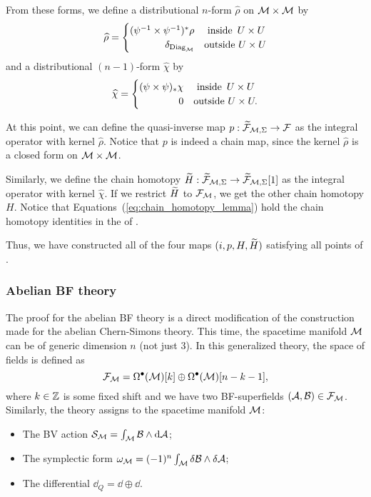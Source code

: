 From these forms, we define a distributional $n$-form $\hat{\rho}$ on $\mathcal{M} \times \mathcal{M}$ by
\begin{equation*}
    \hat{\rho} = 
        \begin{cases}
            (\psi^{-1} \times \psi^{-1})^* \rho & \text{ inside } \,  U \times U \\
             \hfill \delta_{\diag_\M}           &\text{outside } U \times U
        \end{cases}
\end{equation*}
and a distributional $(n-1)$-form $\hat{\chi}$ by
\begin{equation*}
    \hat{\chi} = 
        \begin{cases}
            (\psi \times \psi)_* \chi & \text{ inside } \,  U \times U \\
             \hfill 0                 &\text{outside } U \times U .
        \end{cases}
\end{equation*}

At this point, we can define the quasi-inverse map $p: \widetilde{\mathcal{F}}_{\mathcal{M}, \Sigma} \rightarrow \mathcal{F}$ as the integral operator with kernel $\hat{\rho}$.
Notice that $p$ is indeed a chain map, since the kernel $\hat{\rho}$ is a closed form on $\mathcal{M} \times \mathcal{M}$.

Similarly, we define the chain homotopy $\widetilde{H} : \widetilde{\mathcal{F}}_{\mathcal{M}, \Sigma} \rightarrow \widetilde{\mathcal{F}}_{\mathcal{M}, \Sigma}[1]$ as the integral operator with kernel $\hat{\chi}$.
If we restrict $\widetilde{H}$ to $\mathcal{F}_{\mathcal{M}}$, we get the other chain homotopy $H$.
Notice that Equations~(\ref{eq:chain_homotopy_lemma}) hold the chain homotopy identities in the  of .

Thus, we have constructed all of the four maps $(i, p, H, \widetilde{H})$ satisfying all points of .

\subsubsection{Abelian BF theory}
\label{subsubsec:abelain_bf_theory}

The proof for the abelian BF theory is a direct modification of the construction made for the abelian Chern-Simons theory.
This time, the spacetime manifold $\mathcal{M}$ can be of generic dimension $n$ (not just 3).
In this generalized theory, the space of fields is defined as
\begin{equation*}
    \mathcal{F}_{\mathcal{M}} = 
    \Omega^\bullet (\mathcal{M})[k] \oplus
    \Omega^\bullet (\mathcal{M})[n-k-1],
\end{equation*}
where $k \in \mathbb{Z}$ is some fixed shift and we have two BF-superfields $(\mathcal{A}, \mathcal{B}) \in \mathcal{F}_{\mathcal{M}}$.
Similarly, the theory assigns to the spacetime manifold $\mathcal{M}$:
\begin{itemize}
    \item The BV action $\mathcal{S}_{\mathcal{M}} = \int_{\mathcal{M}} \mathcal{B} \wedge \dd \mathcal{A}$;
    \item The symplectic form $\omega_{\mathcal{M}} = (-1)^n  \int_{\mathcal{M}} \delta \mathcal{B} \wedge \delta \mathcal{A}$;
    \item The differential $\dd_Q = \dd \oplus \dd$.
\end{itemize}

